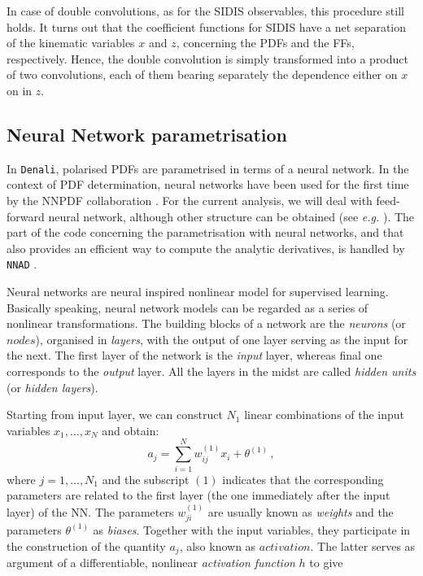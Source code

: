 In case of double convolutions, as for the SIDIS observables, this procedure still holds. It turns out that the coefficient functions for SIDIS have a net separation of the kinematic variables $x$ and $z$, concerning the PDFs and the FFs, respectively. Hence, the double convolution is simply transformed into a product of two convolutions, each of them bearing separately the dependence either on $x$ on in $z$. 


\subsection{Neural Network parametrisation}
\label{sec:NN}

In \texttt{Denali}, polarised PDFs are parametrised in terms of a neural network. In the context of PDF determination, neural networks have been used for the first time by the NNPDF collaboration \cite{Forte:2002fg}. For the current analysis, we will deal with feed-forward neural network, although other structure can be obtained (see \textit{e.g.} \cite{Bishop}). The part of the code concerning the parametrisation with neural networks, and that also provides an efficient way to compute the analytic derivatives, is handled by \texttt{NNAD} \cite*{AbdulKhalek:2020uza}.\par
Neural networks are neural inspired nonlinear model for supervised learning. Basically speaking, neural network models can be regarded as a series of nonlinear transformations. The building blocks of a network are the \textit{neurons} (or $\textit{nodes}$), organised in \textit{layers}, with the output of one layer serving as the input for the next. The first layer of the network is the \textit{input} layer, whereas final one corresponds to the \textit{output} layer. All the layers in the midst are called \textit{hidden units} (or \textit{hidden layers}).\par
Starting from input layer, we can construct $N_1$ linear combinations of the input variables $x_1, \dots, x_N$ and obtain:
\begin{equation}
  a_j = \sum_{i=1}^{N} w_{ij}^{(1)} x_i + \theta^{(1)}\,,
  \label{eq:activation}
\end{equation}
where $j=1,\dots,N_1$ and the subscript $(1)$ indicates that the corresponding parameters are related to the first layer (the one immediately after the input layer) of the NN. The parameters $w^{(1)}_{ji}$ are usually known as \textit{weights} and the parameters $\theta^{(1)}$ as \textit{biases}. Together with the input variables, they participate in the construction of the quantity $a_j$, also known as $activation$. The latter serves as argument of a differentiable, nonlinear \textit{activation function} $h$ to give
